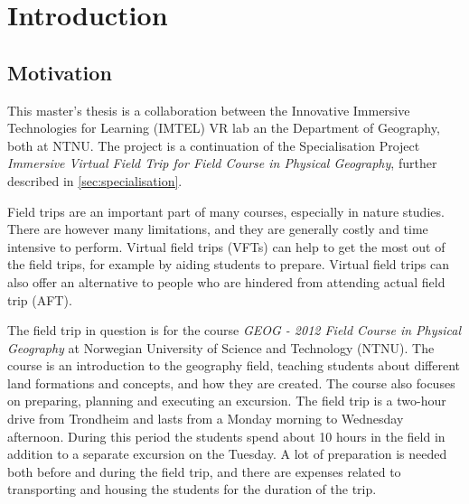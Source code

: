\chapter{Introduction}
\section{Motivation}
    \label{sec:motivation}
    This master's thesis is a collaboration between the Innovative Immersive Technologies for Learning (IMTEL) VR lab an the Department of Geography, both at NTNU. The project is a continuation of the Specialisation Project \emph{Immersive Virtual Field Trip for Field Course in Physical Geography}\cite{specialisation}, further described in \cref{sec:specialisation}.
    
    Field trips are an important part of many courses, especially in nature studies. There are however many limitations, and they are generally costly and time intensive to perform. Virtual field trips (VFTs) can help to get the most out of the field trips, for example by aiding students to prepare. Virtual field trips can also offer an alternative to people who are hindered from attending actual field trip (AFT).
    
    The field trip in question is for the course \emph{GEOG - 2012 Field Course in Physical Geography} at Norwegian University of Science and Technology (NTNU). The course is an introduction to the geography field, teaching students about different land formations and concepts, and how they are created\cite{geog2012}. The course also focuses on preparing, planning and executing an excursion. The field trip is a two-hour drive from Trondheim and lasts from a Monday morning to Wednesday afternoon. During this period the students spend about 10 hours in the field in addition to a separate excursion on the Tuesday. A lot of preparation is needed both before and during the field trip, and there are expenses related to transporting and housing the students for the duration of the trip.
    
